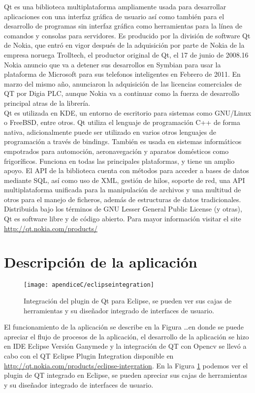 Qt es una biblioteca multiplataforma ampliamente usada para desarrollar aplicaciones con 
una interfaz gráfica de usuario así como también para el desarrollo de programas sin 
interfaz gráfica como herramientas para la línea de comandos y consolas para servidores.
Es producido por la división de software Qt de Nokia, que entró en vigor después de la 
adquisición por parte de Nokia de la empresa noruega Trolltech, el productor original 
de Qt, el 17 de junio de 2008.16 Nokia anuncio que va a detener sus desarrollos en Symbian 
para usar la plataforma de Microsoft para sus telefonos inteligentes en Febrero de 2011.
En marzo del mismo año, anunciaron la adquisición de las licencias comerciales de QT por 
Digia PLC, aunque Nokia va a continuar como la fuerza de desarrollo principal atras de 
la librería.\\
Qt es utilizada en KDE, un entorno de escritorio para sistemas como GNU/Linux o FreeBSD, 
entre otros. Qt utiliza el lenguaje de programación C++ de forma nativa, adicionalmente 
puede ser utilizado en varios otros lenguajes de programación a través de bindings. 
También es usada en sistemas informáticos empotrados para automoción, aeronavegación y 
aparatos domésticos como frigoríficos.
Funciona en todas las principales plataformas, y tiene un amplio apoyo. El API de la 
biblioteca cuenta con métodos para acceder a bases de datos mediante SQL, así como uso 
de XML, gestión de hilos, soporte de red, una API multiplataforma unificada para la 
manipulación de archivos y una multitud de otros para el manejo de ficheros, además de 
estructuras de datos tradicionales.
Distribuida bajo los términos de GNU Lesser General Public License (y otras), Qt es 
software libre y de código abierto. Para mayor información visitar el site 
\url{http://qt.nokia.com/products/}

\section{Descripción de la aplicación}
\begin{figure}[h]
 \centering
  \texttt{[image: apendiceC/eclipseintegration]}
  \caption{Integración del plugin de Qt para Eclipse, se pueden ver sus cajas de herramientas 
  y su diseñador integrado de interfaces de usuario.}
\label{fig:eclipseintegration}
\end{figure}
El funcionamiento de la aplicación se describe en la Figura \ldots en donde
se puede apreciar el flujo de procesos de la aplicación, el desarrollo de la aplicación se 
hizo en IDE Eclipse Versión Ganymede y la integración de QT con Opencv se llevó a cabo con 
el QT Eclipse Plugin Integration disponible en \url{http://qt.nokia.com/products/eclipse-integration}.
En la Figura \ref{fig:eclipseintegration} podemos ver el plugin de QT integrado en Eclipse, se 
pueden apreciar sus cajas de herramientas y su diseñador integrado de interfaces de usuario.

